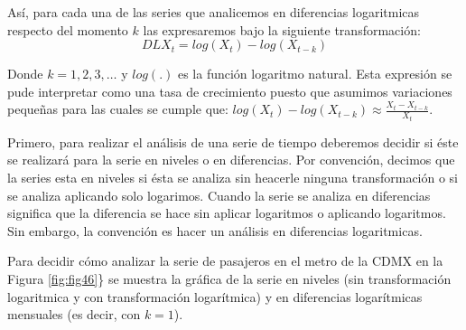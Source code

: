 \documentclass[
]{book}
\begin{document}
Así, para cada una de las series que analicemos en diferencias logaritmicas respecto del momento \(k\) las expresaremos bajo la siguiente transformación:
\begin{equation*}
    DLX_t = log(X_t) - log(X_{t-k})
\end{equation*}

Donde \(k = 1, 2, 3, \ldots\) y \(log(.)\) es la función logaritmo natural. Esta expresión se pude interpretar como una tasa de crecimiento puesto que asumimos variaciones pequeñas para las cuales se cumple que: \(log(X_t) - log(X_{t-k}) \approx \frac{X_t - X_{t-k}}{X_t}\).

Primero, para realizar el análisis de una serie de tiempo deberemos decidir si éste se realizará para la serie en niveles o en diferencias. Por convención, decimos que la series esta en niveles si ésta se analiza sin heacerle ninguna transformación o si se analiza aplicando solo logarimos. Cuando la serie se analiza en diferencias significa que la diferencia se hace sin aplicar logaritmos o aplicando logaritmos. Sin embargo, la convención es hacer un análisis en diferencias logaritmicas.

Para decidir cómo analizar la serie de pasajeros en el metro de la CDMX en la Figura \ref{fig:fig46}\} se muestra la gráfica de la serie en niveles (sin transformación logaritmica y con transformación logarítmica) y en diferencias logarítmicas mensuales (es decir, con \(k = 1\)).
\end{document}
